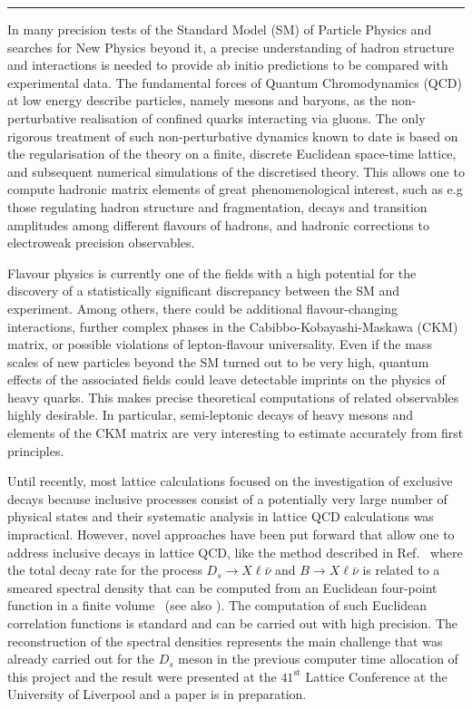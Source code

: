 \rule{\textwidth}{0.4pt}

In many precision tests of the Standard Model (SM) of Particle Physics and
searches for New Physics beyond it, a precise understanding of hadron
structure and interactions is needed to provide ab initio predictions
to be compared with experimental data. The fundamental forces of Quantum
Chromodynamics (QCD) at low energy describe particles, namely mesons and
baryons, as the non-perturbative realisation of confined quarks interacting
via gluons. The only rigorous treatment of such non-perturbative
dynamics known to date is based on the regularisation of the theory on
a finite, discrete Euclidean space-time lattice, and subsequent
numerical simulations of the discretised theory. This allows one to
compute hadronic matrix elements of great phenomenological interest,
such as e.g those regulating hadron structure and fragmentation, decays and transition
amplitudes among different flavours of hadrons, and hadronic corrections
to electroweak precision observables.

Flavour physics is currently one of the fields with a high potential
for the discovery of a statistically significant discrepancy between the SM and
experiment. Among others, there could be additional flavour-changing
interactions, further complex phases in the Cabibbo-Kobayashi-Maskawa (CKM)
matrix, or possible violations
of lepton-flavour universality. Even if the mass scales of new
particles beyond the SM turned out to be very high, quantum effects of
the associated fields could leave detectable imprints on the physics
of heavy quarks.
This makes precise theoretical computations of related observables
highly desirable. In particular, semi-leptonic decays of heavy mesons
and elements of the CKM matrix are very
interesting to estimate accurately from first principles.

Until recently, most lattice calculations focused on the investigation
of exclusive decays because inclusive processes consist
of a potentially very large number of physical states and their
systematic analysis in lattice QCD calculations was impractical.
However, novel approaches have been put forward that allow one to address
inclusive decays in lattice QCD, like the method described in
Ref.~\cite{Gambino:2020crt} where the total decay rate for the process
$D_s \to X\ell\bar\nu$ and $B \to X\ell\bar\nu$   is related to a smeared spectral
density that can be computed from an Euclidean four-point function in a finite
volume~\cite{Hansen:2019idp} (see
also \cite{Bulava:2019kbi,Bulava:2021fre,Gambino:2022dvu}). The computation of such
Euclidean correlation functions is standard and can be carried out
with high precision.
The reconstruction of the spectral densities
represents the main challenge that was already carried out for the $D_s$ meson
in the previous computer time allocation of this project and the result were
presented at the $41^{\mbox{st}}$ Lattice Conference at the University of Liverpool 
\cite{talklatt2024_ale, talklatt2024_chr}
and a paper is in preparation.

